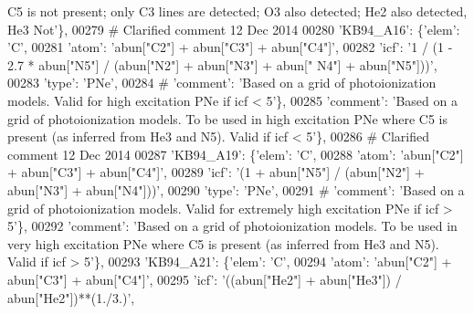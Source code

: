 \begin{DoxyCode}
{       C5 is not present; only C3 lines are detected; O3 also detected; He2 also detected, He3 Not'}\},
00279 \textcolor{comment}{# Clarified comment 12 Dec 2014}
00280                          \textcolor{stringliteral}{'KB94\_A16'}: \{\textcolor{stringliteral}{'elem'}: \textcolor{stringliteral}{'C'},
00281                                       \textcolor{stringliteral}{'atom'}: \textcolor{stringliteral}{'abun["C2"] + abun["C3"] + abun["C4"]'},
00282                                       \textcolor{stringliteral}{'icf'}: \textcolor{stringliteral}{'1 / (1 - 2.7 * abun["N5"] / (abun["N2"] + abun["N3"] + abun["
      N4"] + abun["N5"]))'},
00283                                       \textcolor{stringliteral}{'type'}: \textcolor{stringliteral}{'PNe'},
00284 \textcolor{comment}{#                                     'comment': 'Based on a grid of photoionization models. Valid for high
       excitation PNe if icf < 5'\},}
00285                                        \textcolor{stringliteral}{'comment'}: \textcolor{stringliteral}{'Based on a grid of photoionization models. To be used in
       high excitation PNe where C5 is present (as inferred from He3 and N5). Valid if icf < 5'}\},
00286 \textcolor{comment}{# Clarified comment 12 Dec 2014}
00287                          \textcolor{stringliteral}{'KB94\_A19'}: \{\textcolor{stringliteral}{'elem'}: \textcolor{stringliteral}{'C'},
00288                                       \textcolor{stringliteral}{'atom'}: \textcolor{stringliteral}{'abun["C2"] + abun["C3"] + abun["C4"]'},
00289                                       \textcolor{stringliteral}{'icf'}: \textcolor{stringliteral}{'(1 + abun["N5"] / (abun["N2"] + abun["N3"] + abun["N4"]))'},
00290                                       \textcolor{stringliteral}{'type'}: \textcolor{stringliteral}{'PNe'},
00291 \textcolor{comment}{#                                      'comment': 'Based on a grid of photoionization models. Valid for
       extremely high excitation PNe if icf > 5'\},}
00292                                        \textcolor{stringliteral}{'comment'}: \textcolor{stringliteral}{'Based on a grid of photoionization models. To be used in
       very high excitation PNe where C5 is present (as inferred from He3 and N5). Valid if icf > 5'}\},
00293                          \textcolor{stringliteral}{'KB94\_A21'}: \{\textcolor{stringliteral}{'elem'}: \textcolor{stringliteral}{'C'},
00294                                       \textcolor{stringliteral}{'atom'}: \textcolor{stringliteral}{'abun["C2"] + abun["C3"] + abun["C4"]'},
00295                                       \textcolor{stringliteral}{'icf'}: \textcolor{stringliteral}{'((abun["He2"] + abun["He3"]) / abun["He2"])**(1./3.)'},

\end{DoxyCode}
